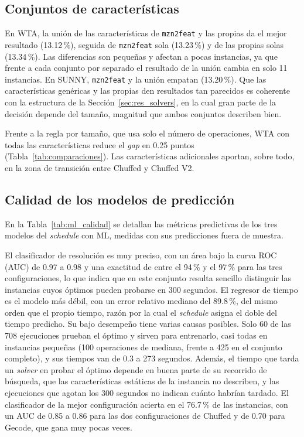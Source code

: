 \subsection{Conjuntos de características}

En WTA, la unión de las características de \texttt{mzn2feat} y las propias
da el mejor resultado (13.12\,\%), seguida de \texttt{mzn2feat} sola
(13.23\,\%) y de las propias solas (13.34\,\%). Las diferencias son pequeñas y
afectan a pocas instancias, ya que frente a cada conjunto por separado el
resultado de la unión cambia en solo 11 instancias. En SUNNY, \texttt{mzn2feat}
y la unión empatan (13.20\,\%). Que las características genéricas y las propias
den resultados tan parecidos es coherente con la estructura de la
Sección~\ref{sec:res_solvers}, en la cual gran parte de la decisión depende del
tamaño, magnitud que ambos conjuntos describen bien.

Frente a la regla por tamaño, que usa solo el número de operaciones, WTA con
todas las características reduce el \textit{gap} en 0.25 puntos
(Tabla~\ref{tab:comparaciones}). Las características adicionales aportan,
sobre todo, en la zona de transición entre Chuffed y Chuffed V2.

\subsection{Calidad de los modelos de predicción}

En la Tabla~\ref{tab:ml_calidad} se detallan las métricas predictivas de los
tres modelos del \textit{schedule} con ML, medidas con sus predicciones fuera
de muestra.



El clasificador de resolución es muy preciso, con un área bajo la curva ROC
(AUC) de 0.97 a 0.98 y una exactitud de entre el 94\,\% y el 97\,\% para las
tres configuraciones, lo que indica que en este conjunto resulta sencillo
distinguir las instancias cuyos óptimos pueden probarse en 300 segundos. El
regresor de tiempo es el modelo más débil, con un error relativo mediano del
89.8\,\%, del mismo orden que el propio tiempo, razón por la cual el
\textit{schedule} asigna el doble del tiempo predicho. Su bajo desempeño
tiene varias causas posibles. Solo 60 de las 708 ejecuciones prueban el
óptimo y sirven para entrenarlo, casi todas en instancias pequeñas (100
operaciones de mediana, frente a 425 en el conjunto completo), y sus tiempos
van de 0.3 a 273 segundos. Además, el tiempo que tarda un \textit{solver} en
probar el óptimo depende en buena parte de su recorrido de búsqueda, que las
características estáticas de la instancia no describen, y las ejecuciones
que agotan los 300 segundos no indican cuánto habrían tardado. El clasificador de la
mejor configuración acierta en el 76.7\,\% de las instancias, con un AUC de
0.85 a 0.86 para las dos configuraciones de Chuffed y de 0.70 para Gecode, que
gana muy pocas veces.

